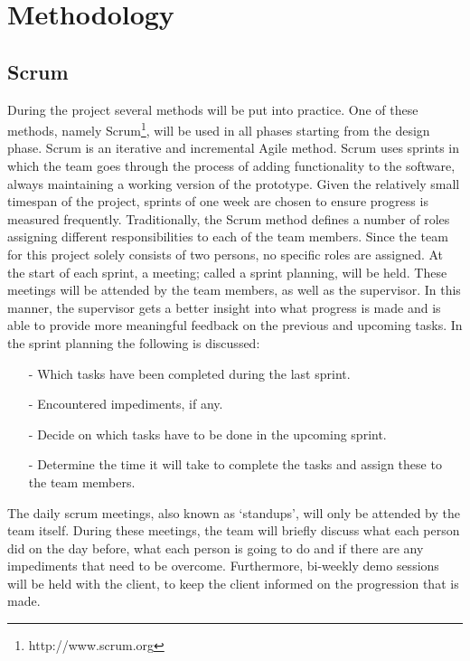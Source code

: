 \section{Methodology}
\label{sec:meth}
\subsection{Scrum}
During the project several methods will be put into practice. One of these methods, namely Scrum\footnote{http://www.scrum.org}, will be used in all phases starting from the design phase. Scrum is an iterative and incremental Agile method. Scrum uses sprints in which the team goes through the process of adding functionality to the software, always maintaining a working version of the prototype. Given the relatively small timespan of the project, sprints of one week are chosen to ensure progress is measured frequently. Traditionally, the Scrum method defines a number of roles assigning different responsibilities to each of the team members. Since the team for this project solely consists of two persons, no specific roles are assigned. At the start of each sprint, a meeting; called a sprint planning, will be held. These meetings will be attended by the team members, as well as the supervisor. In this manner, the supervisor gets a better insight into what progress is made and is able to provide more meaningful feedback on the previous and upcoming tasks. In the sprint planning the following is discussed:
\begin{itemize}
\item[-]Which tasks have been completed during the last sprint.
\item[-]Encountered impediments, if any.
\item[-]Decide on which tasks have to be done in the upcoming sprint.
\item[-]Determine the time it will take to complete the tasks and assign these to the team members.
\end{itemize}
The daily scrum meetings, also known as `standups', will only be attended by the team itself. During these meetings, the team will briefly discuss what each person did on the day before, what each person is going to do and if there are any impediments that need to be overcome. Furthermore, bi-weekly demo sessions will be held with the client, to keep the client informed on the progression that is made.
